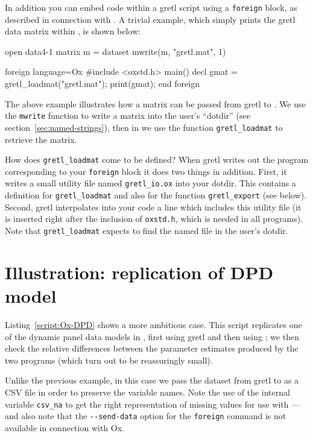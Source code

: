 In addition you can embed  code within a gretl script
using a \texttt{foreign} block, as described in connection with
.  A trivial example, which simply prints the gretl data
matrix within , is shown below:
%
\begin{code}
open data4-1
matrix m = { dataset }
mwrite(m, "gretl.mat", 1)

foreign language=Ox 
#include <oxstd.h>
main()
{
   decl gmat = gretl_loadmat("gretl.mat");
   print(gmat);
}
end foreign
\end{code}

The above example illustrates how a matrix can be passed from
gretl to .  We use the \texttt{mwrite} function to write
a matrix into the user's ``dotdir'' (see
section~\ref{sec:named-strings}), then in  we use the function
\verb|gretl_loadmat| to retrieve the matrix.

How does \verb|gretl_loadmat| come to be defined?  When gretl
writes out the  program corresponding to your \texttt{foreign}
block it does two things in addition.  First, it writes a small
utility file named \verb|gretl_io.ox| into your dotdir.  This contains
a definition for \verb|gretl_loadmat| and also for the function
\verb|gretl_export| (see below).  Second, gretl interpolates
into your  code a line which includes this utility file (it is
inserted right after the inclusion of \texttt{oxstd.h}, which is
needed in all  programs).  Note that \verb|gretl_loadmat|
expects to find the named file in the user's dotdir.

\section{Illustration: replication of DPD model}
\label{sec:dpd-replication}

Listing~\ref{script:Ox-DPD} shows a more ambitious case.  This script
replicates one of the dynamic panel data models in
\cite{arellano-bond91}, first using gretl and then using ; we
then check the relative differences between the parameter estimates
produced by the two programs (which turn out to be reassuringly
small).

Unlike the previous example, in this case we pass the dataset from
gretl to  as a CSV file in order to preserve the
variable names.  Note the use of the internal variable \verb|csv_na|
to get the right representation of missing values for use with
---and also note that the \verb|--send-data| option for the
\texttt{foreign} command is not available in connection with Ox.

